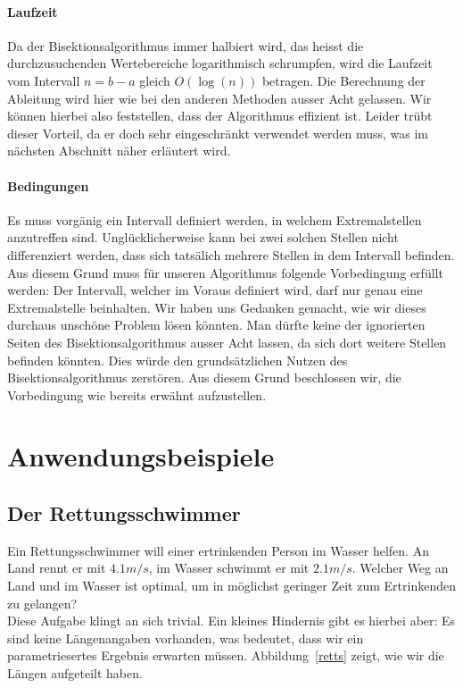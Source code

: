 \documentclass[10pt]{article}         %
\begin{document}
\paragraph{Laufzeit}
Da der Bisektionsalgorithmus immer halbiert wird, das heisst die durchzusuchenden Wertebereiche logarithmisch schrumpfen, wird die Laufzeit vom Intervall $n=b-a$ gleich $O(\log(n))$ betragen. Die Berechnung der Ableitung wird hier wie bei den anderen Methoden ausser Acht gelassen. Wir können hierbei also feststellen, dass der Algorithmus effizient ist. Leider trübt dieser Vorteil, da er doch sehr eingeschränkt verwendet werden muss, was im nächsten Abschnitt näher erläutert wird.

\paragraph{Bedingungen}
Es muss vorgänig ein Intervall definiert werden, in welchem Extremalstellen anzutreffen sind. Unglücklicherweise kann bei zwei solchen Stellen nicht differenziert werden, dass sich tatsälich mehrere Stellen in dem Intervall befinden. Aus diesem Grund muss für unseren Algorithmus folgende Vorbedingung erfüllt werden: Der Intervall, welcher im Voraus definiert wird, darf nur genau eine Extremalstelle beinhalten. Wir haben uns Gedanken gemacht, wie wir dieses durchaus unschöne Problem lösen könnten. Man dürfte keine der ignorierten Seiten des Bisektionsalgorithmus ausser Acht lassen, da sich dort weitere Stellen befinden könnten. Dies würde den grundsätzlichen Nutzen des Bisektionsalgorithmus zerstören. Aus diesem Grund beschlossen wir, die Vorbedingung wie bereits erwähnt aufzustellen.

\pagebreak
\section{Anwendungsbeispiele}
\subsection{Der Rettungsschwimmer}
Ein Rettungsschwimmer will einer ertrinkenden Person im Wasser helfen. An Land rennt er mit $4.1 m/s$, im Wasser schwimmt er mit $2.1 m/s$. Welcher Weg an Land und im Wasser ist optimal, um in möglichst geringer Zeit zum Ertrinkenden zu gelangen? \\
    Diese Aufgabe klingt an sich trivial. Ein kleines Hindernis gibt es hierbei aber: Es sind keine Längenangaben vorhanden, was bedeutet, dass wir ein parametriesertes Ergebnis erwarten müssen. Abbildung~\ref{retts} zeigt, wie wir die Längen aufgeteilt haben.
\end{document}
